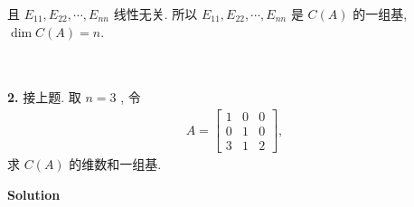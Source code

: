 \documentclass[11pt,a4paper,openany,oneside]{book}
\newcommand\Solution{\noindent\textbf{\textsf{Solution}}\par\medskip}
\begin{document}
且 $ E_{11}, E_{22}, \cdots,E_{nn} $ 线性无关. 所以 $ E_{11}, E_{22}, \cdots,E_{nn} $ 是 $ C(A) $ 的一组基,  $ \dim C(A) = n $. \\  \\  \\


\begin{myexample}
	\textbf{2.} 
接上题. 取 $ n=3 $ , 令
\begin{gather*}
A=
\begin{bmatrix}
1 & 0 & 0 \\
0 & 1 & 0 \\
3 & 1 & 2 
\end{bmatrix},
\end{gather*}
求 $ C(A) $ 的维数和一组基.  
\end{myexample}
\Solution
\end{document}
